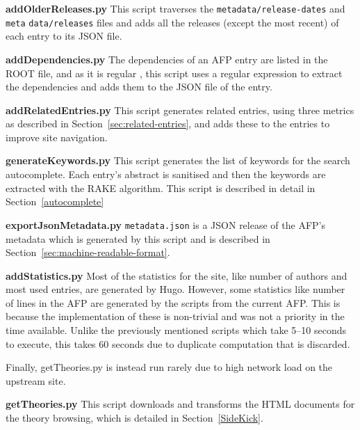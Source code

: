 \documentclass[bsc,frontabs,oneside,singlespacing,parskip,deptreport,logo]{infthesis}
\begin{document}
\textbf{addOlderReleases.py} This script traverses the \texttt{metadata/release-dates} and \texttt{meta} \texttt{data/releases} files and adds all the releases (except the most recent) of each entry to its JSON file.

\textbf{addDependencies.py} The dependencies of an AFP entry are listed in the ROOT file, and as it is regular \cite{isabelle_system}, this script uses a regular expression to extract the dependencies and adds them to the JSON file of the entry.

\textbf{addRelatedEntries.py} This script generates related entries, using three metrics as described in Section~\ref{sec:related-entries}, and adds these to the entries to improve site navigation.

\textbf{generateKeywords.py} This script generates the list of keywords for the search autocomplete. Each entry's abstract is sanitised and then the keywords are extracted with the RAKE algorithm. This script is described in detail in Section~\ref{autocomplete}

\textbf{exportJsonMetadata.py} \texttt{metadata.json} is a JSON release of the AFP's metadata which is generated by this script and is described in Section~\ref{sec:machine-readable-format}.

\textbf{addStatistics.py} Most of the statistics for the site, like number of authors and most used entries, are generated by Hugo. However, some statistics like number of lines in the AFP are generated by the scripts from the current AFP\@. This is because the implementation of these is non-trivial and was not a priority in the time available. Unlike the previously mentioned scripts which take 5--10 seconds to execute, this takes 60 seconds due to duplicate computation that is discarded.

Finally, getTheories.py is instead run rarely due to high network load on the upstream site.

\textbf{getTheories.py} This script downloads and transforms the HTML documents for the theory browsing, which is detailed in Section~\ref{SideKick}. 
\end{document}
